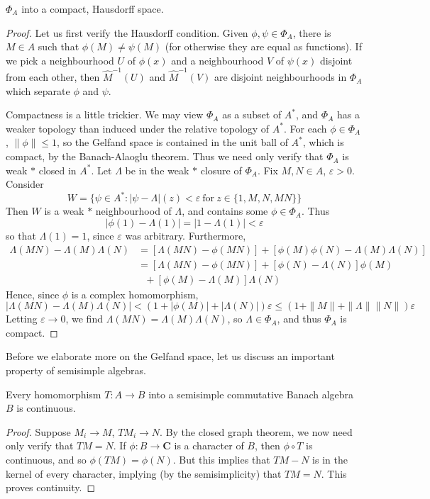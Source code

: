 \begin{theorem}
    $\Phi_A$ into a compact, Hausdorff space.
\end{theorem}
\begin{proof}
    Let us first verify the Hausdorff condition. Given $\phi, \psi \in \Phi_A$, there is $M \in A$ such that $\phi(M) \neq \psi(M)$ (for otherwise they are equal as functions). If we pick a neighbourhood $U$ of $\phi(x)$ and a neighbourhood $V$ of $\psi(x)$ disjoint from each other, then $\widehat{M}^{-1}(U)$ and $\widehat{M}^{-1}(V)$ are disjoint neighbourhoods in $\Phi_A$ which separate $\phi$ and $\psi$.

    Compactness is a little trickier. We may view $\Phi_A$ as a subset of $A^*$, and $\Phi_A$ has a weaker topology than induced under the relative topology of $A^*$. For each $\phi \in \Phi_A$, $\| \phi \| \leq 1$, so the Gelfand space is contained in the unit ball of $A^*$, which is compact, by the Banach-Alaoglu theorem. Thus we need only verify that $\Phi_A$ is weak $*$ closed in $A^*$. Let $\Lambda$ be in the weak $*$ closure of $\Phi_A$. Fix $M,N \in A$, $\varepsilon > 0$. Consider
    \[ W = \{ \psi \in A^* : | \psi - \Lambda | (z) < \varepsilon\ \text{for}\ z \in \{ 1, M, N, MN \} \} \]
    Then $W$ is a weak $*$ neighbourhood of $\Lambda$, and contains some $\phi \in \Phi_A$. Thus
    \[ |\phi(1) - \Lambda(1)| = | 1 - \Lambda(1) | < \varepsilon \]
    so that $\Lambda(1) = 1$, since $\varepsilon$ was arbitrary. Furthermore,
    \begin{align*}
        \Lambda(MN) -   \Lambda(M) \Lambda(N) &= [\Lambda(MN) - \phi(MN)] + [\phi(M)\phi(N) - \Lambda(M)\Lambda(N)]\\
        &= [\Lambda(MN) - \phi(MN)] + [\phi(N) - \Lambda(N)] \phi(M)\\
        &\ \ \ + [\phi(M) - \Lambda(M)] \Lambda(N)
    \end{align*}
    Hence, since $\phi$ is a complex homomorphism,
    \[ | \Lambda(MN) -   \Lambda(M) \Lambda(N) | < (1 + |\phi(M)| + |\Lambda(N)|) \varepsilon \leq (1 + \| M \| + \| \Lambda \| \| N \|) \varepsilon \]
    Letting $\varepsilon \to 0$, we find $\Lambda(MN) = \Lambda(M) \Lambda(N)$, so $\Lambda \in \Phi_A$, and thus $\Phi_A$ is compact.
\end{proof}

Before we elaborate more on the Gelfand space, let us discuss an important property of semisimple algebras.

\begin{prop}
    Every homomorphism $T: A \to B$ into a semisimple commutative Banach algebra $B$ is continuous.
\end{prop}
\begin{proof}
    Suppose $M_i \to M$, $TM_i \to N$. By the closed graph theorem, we now need only verify that $TM = N$. If $\phi: B \to \mathbf{C}$ is a character of $B$, then $\phi \circ T$ is continuous, and so $\phi(TM) = \phi(N)$. But this implies that $TM - N$ is in the kernel of every character, implying (by the semisimplicity) that $TM = N$. This proves continuity.
\end{proof}

